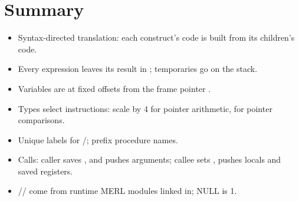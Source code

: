 \section{Summary}
\begin{itemize}
  \item Syntax-directed translation: each construct's code is built from its children's code.
  \item Every expression leaves its result in ; temporaries go on the stack.
  \item Variables are at fixed offsets from the frame pointer .
  \item Types select instructions: scale by 4 for pointer arithmetic,  for pointer comparisons.
  \item Unique labels for /; prefix procedure names.
  \item Calls: caller saves ,  and pushes arguments; callee sets
        , pushes locals and saved registers.
  \item {}// come from runtime MERL modules linked in; NULL is 1.
\end{itemize}
